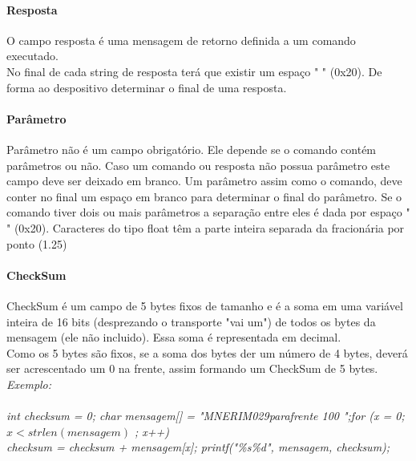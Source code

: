 \documentclass[11pt,	 papera4]{article}
\begin{document}
\paragraph{\textbf{Resposta} \newline \newline} 
O campo resposta é uma mensagem de retorno definida a um comando executado. \\
No final de cada string de resposta terá que existir um espaço " " (0x20). De forma ao despositivo determinar o final de uma resposta. \\

\paragraph{\textbf{Parâmetro} \newline \newline } 
Parâmetro não é um campo obrigatório. Ele depende se o comando contém parâmetros ou não.
Caso um comando ou resposta não possua parâmetro este campo deve ser deixado em branco.
Um parâmetro assim como o comando, deve conter no final um espaço em branco para determinar o final do parâmetro. 
Se o comando tiver dois ou mais parâmetros a separação entre eles é dada por espaço " " (0x20). Caracteres do tipo float têm a parte inteira separada da fracionária por ponto (1.25) 

\paragraph{\textbf{CheckSum} \newline \newline } 
CheckSum é um campo de 5 bytes fixos de tamanho e é a soma em uma variável inteira de 16 bits (desprezando o transporte "vai um") de todos os bytes da mensagem (ele não incluido). Essa soma é representada em decimal. \\ Como os 5 bytes são fixos, se a soma dos bytes der um número de 4 bytes, deverá ser acrescentado um 0 na frente, assim formando um CheckSum de 5 bytes.\\

\textsl{ Exemplo: \\\\ int checksum = 0; \newline char mensagem[] = "MNERIM029parafrente 100 ";\newline for (x = 0; $x
< strlen(mensagem)$
; x++) \\
 \hspace*{1cm}checksum = checksum + mensagem[x]; \newline printf("\%s\%d",  mensagem, checksum); 
} \\
\end{document}
